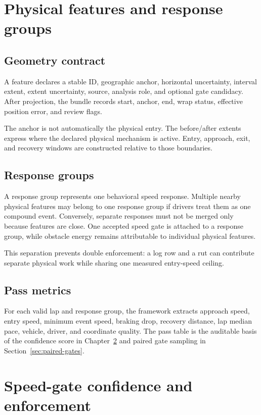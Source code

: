 \documentclass[11pt,oneside]{report}
\begin{document}
\chapter{Physical features and response groups}\label{ch:features}

\section{Geometry contract}

A feature declares a stable ID, geographic anchor, horizontal uncertainty, interval
extent, extent uncertainty, source, analysis role, and optional gate candidacy.  After
projection, the bundle records start, anchor, end, wrap status, effective position error,
and review flags.

The anchor is not automatically the physical entry.  The before/after extents express
where the declared physical mechanism is active.  Entry, approach, exit, and recovery
windows are constructed relative to those boundaries.

\section{Response groups}

A response group represents one behavioral speed response.  Multiple nearby physical
features may belong to one response group if drivers treat them as one compound event.
Conversely, separate responses must not be merged only because features are close.  One
accepted speed gate is attached to a response group, while obstacle energy remains
attributable to individual physical features.

This separation prevents double enforcement: a log row and a rut can contribute
separate physical work while sharing one measured entry-speed ceiling.

\section{Pass metrics}

For each valid lap and response group, the framework extracts approach speed, entry
speed, minimum event speed, braking drop, recovery distance, lap median pace, vehicle,
driver, and coordinate quality.  The pass table is the auditable basis of the confidence
score in Chapter~\ref{ch:gates} and paired gate sampling in
Section~\ref{sec:paired-gates}.

\chapter{Speed-gate confidence and enforcement}\label{ch:gates}
\end{document}
